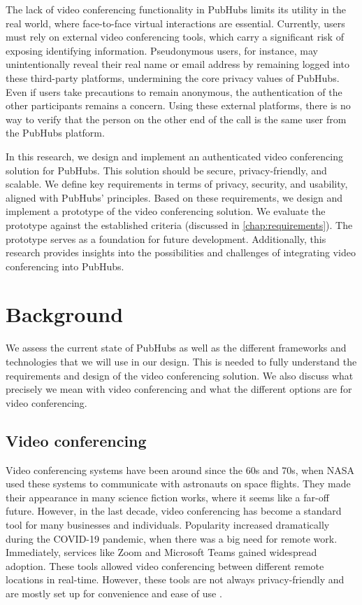 \documentclass{report}
\begin{document}
The lack of video conferencing functionality in PubHubs limits its utility in the real world, where face-to-face
virtual interactions are essential. Currently, users must rely on external video conferencing tools, which carry a
significant risk of exposing identifying information. Pseudonymous users, for instance, may unintentionally reveal
their real name or email address by remaining logged into these third-party platforms, undermining the core privacy
values of PubHubs. Even if users take precautions to remain anonymous, the authentication of the other participants
remains a concern. Using these external platforms, there is no way to verify that the person on the other end of the
call is the same user from the PubHubs platform.

In this research, we design and implement an authenticated video conferencing solution for PubHubs. This
solution should be secure, privacy-friendly, and scalable. We define key requirements in terms of privacy,
security, and usability, aligned with PubHubs’ principles. Based on these requirements, we design and implement
a prototype of the video conferencing solution. We evaluate the prototype against the established
criteria (discussed in \autoref{chap:requirements}). The prototype serves as a foundation for future development.
Additionally, this research provides insights into the possibilities and challenges of integrating video
conferencing into PubHubs.

\chapter{Background}
We assess the current state of PubHubs as well as the different frameworks and technologies that we will use in
our design. This is needed to fully understand the requirements and design of the video conferencing solution. We
also discuss what precisely we mean with video conferencing and what the different options are for video
conferencing.

\section{Video conferencing}
Video conferencing systems have been around since the 60s and 70s, when NASA used these systems to communicate with
astronauts on space flights. They made their appearance in many science fiction works, where it seems like a far-off
future. However, in the last decade, video conferencing has become a standard tool for many businesses and individuals.
Popularity increased dramatically during the COVID-19 pandemic, when there was a big need for remote work.
Immediately, services like Zoom \cite{noauthor_one_nodate} and Microsoft Teams  \cite{noauthor_microsoft_nodate} gained
widespread adoption. These tools allowed video conferencing between different remote locations in real-time.
However, these tools are not always privacy-friendly and are mostly set up for convenience and ease of use \cite{gauthier_dynamic_2021}.
\end{document}

